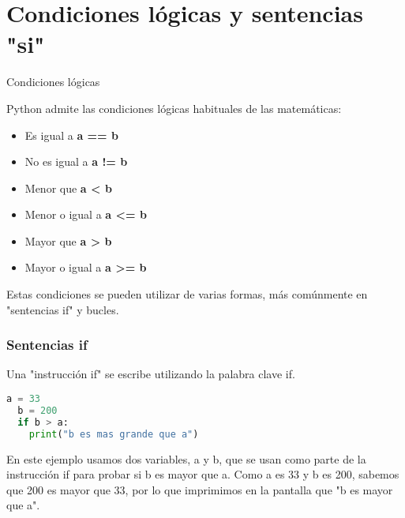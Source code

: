 
\section{Condiciones lógicas y sentencias "si"}

\begin{frame}[c]{Condiciones lógicas}

  Python admite las condiciones lógicas habituales de las matemáticas:

  \vspace{\baselineskip}
  \begin{itemize}
    \item Es igual a \textbf{a == b}
    \pausa
    \item No es igual a \textbf{a != b}
    \pausa
    \item Menor que \textbf{a < b}
    \pausa
    \item Menor o igual a \textbf{a <= b}
    \pausa
    \item Mayor que \textbf{a > b}
    \pausa
    \item Mayor o igual a \textbf{a >= b}
  \end{itemize}

  \vspace{\baselineskip}
  Estas condiciones se pueden utilizar de varias formas, más
  comúnmente en "sentencias \textcolor{codeKeyword}{if}" y bucles.
\end{frame}

\begin{frame}[fragile]
  \frametitle{Sentencias if}

  Una "instrucción if" se escribe utilizando la palabra clave
  \textcolor{codeKeyword}{if}.

  \vspace{\baselineskip}
  \begin{lstlisting}[language=Python]
  a = 33
  b = 200
  if b > a:
    print("b es mas grande que a")
  \end{lstlisting}

  En este ejemplo usamos dos variables, a y b, que se usan como parte de
  la instrucción \textcolor{codeKeyword}{if} para probar si b es mayor
  que a. Como a es 33 y b es 200, sabemos que 200 es mayor que 33,
  por lo que imprimimos en la pantalla que "b es mayor que a".
\end{frame}


